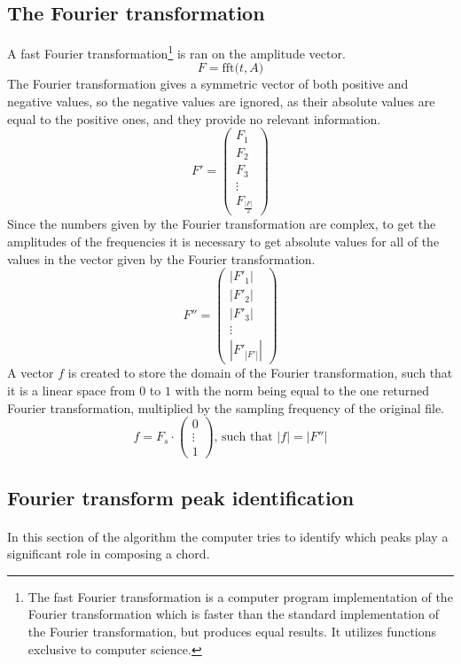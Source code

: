 \documentclass{article}
\begin{document}
\subsection{The Fourier transformation}
A fast Fourier transformation\footnote{The fast Fourier transformation is a 
computer program implementation of the Fourier transformation which is faster
than the standard implementation of the Fourier transformation, but produces 
equal results. It utilizes functions exclusive to computer science.} is ran on 
the amplitude vector.
$$F = \text{fft(}t, A\text{)}$$
The Fourier transformation gives a symmetric vector of both positive and 
negative values, so the negative values are ignored, as their absolute values 
are equal to the positive ones, and they provide no relevant information.
$$F' =
\begin{pmatrix}
	F_1 \\
	F_2 \\
	F_3 \\
	\vdots \\
	F_{\frac{|F|}{2}}
\end{pmatrix}
$$
Since the numbers given by the Fourier transformation are complex, to get the 
amplitudes of the frequencies it is necessary to get absolute values for all 
of the values in the vector given by the Fourier transformation.
$$F'' = 
\begin{pmatrix}
	|F'_1| \\
	|F'_2| \\
	|F'_3| \\
	\vdots \\
	|F'_{|F'|}|
\end{pmatrix}
$$
A vector $f$ is created to store the domain of the Fourier transformation, 
such that it is a linear space from $0$ to $1$ with the norm being equal to 
the one returned Fourier transformation, multiplied by the sampling frequency 
of the original file.
$$f = F_s \cdot
\begin{pmatrix}
	0 \\
	\vdots \\
	1
\end{pmatrix}\text{, such that $|f| = |F''|$}
$$

\subsection{Fourier transform peak identification} 
\paragraph*{}
In this section of the algorithm the computer tries to identify which peaks 
play a significant role in composing a chord. 
\end{document}
